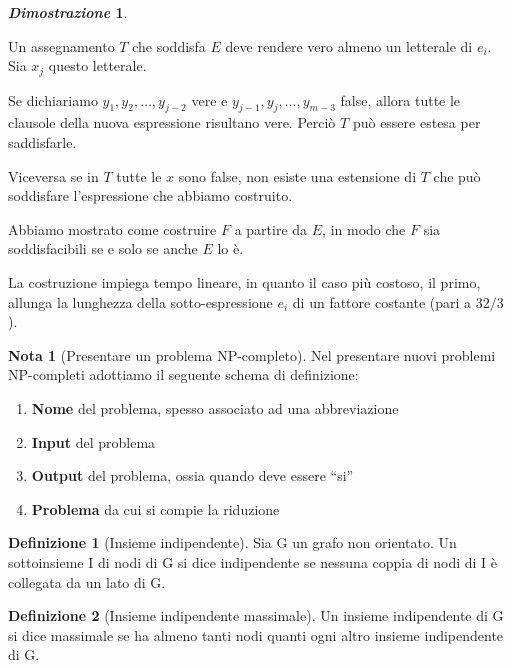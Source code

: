 \documentclass[12pt]{article}
\theoremstyle{definition}
\newtheorem*{mydef}{Definizione}
\newtheorem*{myproof}{\em Dimostrazione}
\newtheorem*{mynote}{Nota}
\begin{document}
\begin{myproof}
\begin{enumerate}
      Un assegnamento \(T\) che soddisfa \(E\) deve rendere vero almeno un letterale di \(e_i\). Sia \(x_j\) questo letterale.\newline

      Se dichiariamo \(y_1, y_2, \ldots, y_{j-2}\) vere e \(y_{j-1}, y_j, \ldots, y_{m-3}\) false, allora tutte le
      clausole della nuova espressione risultano vere. Perci\`o \(T\) pu\`o essere estesa per saddisfarle.\newline

      Viceversa se in \(T\) tutte le \(x\) sono false, non esiste una estensione di \(T\) che pu\`o soddisfare
      l'espressione che abbiamo costruito.

  \end{enumerate}

  Abbiamo mostrato come costruire \(F\) a partire da \(E\), in modo che \(F\) sia soddisfacibili se e solo
  se anche \(E\) lo \`e.

  La costruzione impiega tempo lineare, in quanto il caso pi\`u costoso, il primo, allunga la lunghezza
  della sotto-espressione \(e_i\) di un fattore costante (pari a \(32/3\)).

  \hfill \qedsymbol
\end{myproof}

\begin{mynote}[Presentare un problema NP-completo]
  Nel presentare nuovi problemi NP-completi adottiamo il seguente schema di definizione:

  \begin{enumerate}
  \item \textbf{Nome} del problema, spesso associato ad una abbreviazione
  \item \textbf{Input} del problema
  \item \textbf{Output} del problema, ossia quando deve essere ``si''
  \item \textbf{Problema} da cui si compie la riduzione
  \end{enumerate}

\end{mynote}

\begin{mydef}[Insieme indipendente]
  Sia G un grafo non orientato. Un sottoinsieme I di nodi di G si dice indipendente se
  nessuna coppia di nodi di I \`e collegata da un lato di G.
\end{mydef}

\begin{mydef}[Insieme indipendente massimale]
  Un insieme indipendente di G si dice massimale se ha almeno tanti nodi quanti ogni
  altro insieme indipendente di G.
\end{mydef}
\end{document}
